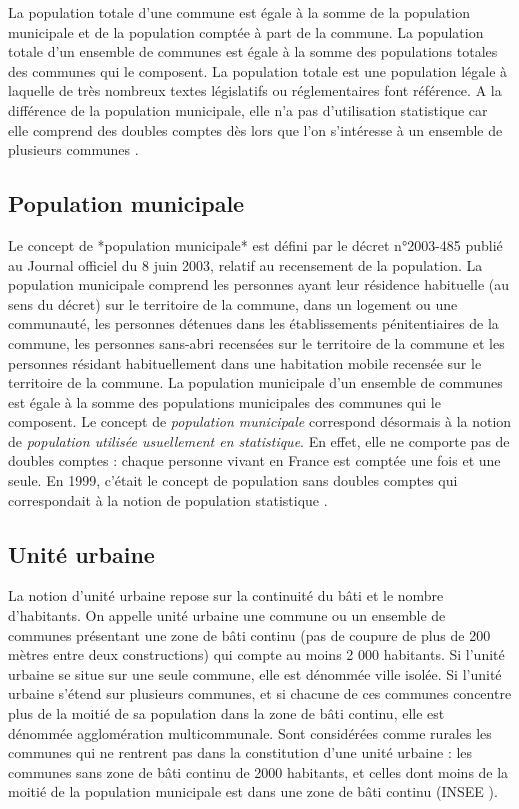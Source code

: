 \documentclass[12pt,english,french,twoside]{book}\usepackage[]{graphicx}\usepackage[]{color}
\begin{document}
La population totale d'une commune est égale à la somme de la population municipale et de la population comptée à part de la commune.
La population totale d'un ensemble de communes est égale à la somme des populations totales des communes qui le composent.
La population totale est une population légale à laquelle de très nombreux textes législatifs ou réglementaires font référence. A la différence de la population municipale, elle n'a pas d'utilisation statistique car elle comprend des doubles comptes dès lors que l'on s'intéresse à un ensemble de plusieurs communes \cite{7}.

\subsection*{Population municipale}
Le concept de *population municipale* est défini par le décret n°2003-485 publié au Journal officiel du 8 juin 2003, relatif au recensement de la population.
La population municipale comprend les personnes ayant leur résidence habituelle (au sens du décret) sur le territoire de la commune, dans un logement ou une communauté, les personnes détenues dans les établissements pénitentiaires de la commune, les personnes sans-abri recensées sur le territoire de la commune et les personnes résidant habituellement dans une habitation mobile recensée sur le territoire de la commune.
La population municipale d'un ensemble de communes est égale à la somme des populations municipales des communes qui le composent.
Le concept de \emph{population municipale} correspond désormais à la notion de \emph{population utilisée usuellement en statistique}. En effet, elle ne comporte pas de doubles comptes : chaque personne vivant en France est comptée une fois et une seule. En 1999, c'était le concept de population sans doubles comptes qui correspondait à la notion de population statistique \cite{6}.


\subsection*{Unité urbaine}
La notion d'unité urbaine repose sur la continuité du bâti et le nombre d'habitants. On appelle unité urbaine une commune ou un ensemble de communes présentant une zone de bâti continu (pas de coupure de plus de 200 mètres entre deux constructions) qui compte au moins 2 000 habitants.
Si l'unité urbaine se situe sur une seule commune, elle est dénommée ville isolée. Si l'unité urbaine s'étend sur plusieurs communes, et si chacune de ces communes concentre plus de la moitié de sa population dans la zone de bâti continu, elle est dénommée agglomération multicommunale.
Sont considérées comme rurales les communes qui ne rentrent pas dans la constitution d'une unité urbaine : les communes sans zone de bâti continu de 2000 habitants, et celles dont moins de la moitié de la population municipale est dans une zone de bâti continu (INSEE \cite{4}).
\end{document}
